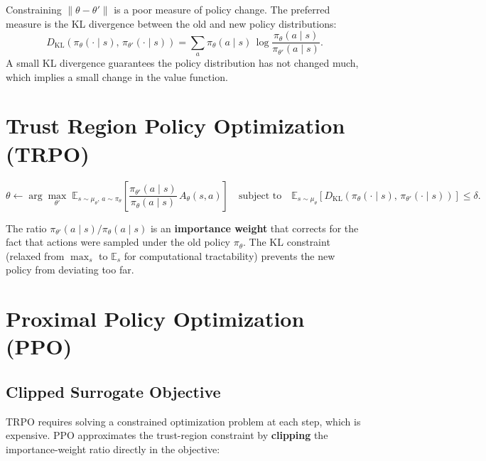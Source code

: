 \documentclass[11pt,a4paper]{article}
\theoremstyle{definition}
\theoremstyle{plain}
\theoremstyle{remark}
\begin{document}
Constraining $\|\theta - \theta'\|$ is a poor measure of policy change. The preferred measure is the KL divergence between the old and new policy distributions:
\[
    D_{\mathrm{KL}}\!\left(\pi_\theta(\cdot \mid s),\, \pi_{\theta'}(\cdot \mid s)\right)
    = \sum_a \pi_\theta(a \mid s)\, \log\frac{\pi_\theta(a \mid s)}{\pi_{\theta'}(a \mid s)}.
\]
A small KL divergence guarantees the policy distribution has not changed much, which implies a small change in the value function.

\section{Trust Region Policy Optimization (TRPO)}

\begin{tcolorbox}[colback=blue!5!white,colframe=blue!75!black,title=\textbf{TRPO Objective (Schulman et al., ICML 2015)}]
\[
    \theta \leftarrow \arg\max_{\theta'}\; \mathbb{E}_{s \sim \mu_\theta,\, a \sim \pi_\theta}\!\left[\frac{\pi_{\theta'}(a \mid s)}{\pi_\theta(a \mid s)}\, A_\theta(s, a)\right]
    \quad \text{subject to} \quad
    \mathbb{E}_{s \sim \mu_\theta}\!\left[D_{\mathrm{KL}}\!\left(\pi_\theta(\cdot \mid s),\, \pi_{\theta'}(\cdot \mid s)\right)\right] \le \delta.
\]
\end{tcolorbox}

The ratio $\pi_{\theta'}(a \mid s)/\pi_\theta(a \mid s)$ is an \textbf{importance weight} that corrects for the fact that actions were sampled under the old policy $\pi_\theta$. The KL constraint (relaxed from $\max_s$ to $\mathbb{E}_s$ for computational tractability) prevents the new policy from deviating too far.

\section{Proximal Policy Optimization (PPO)}

\subsection{Clipped Surrogate Objective}

TRPO requires solving a constrained optimization problem at each step, which is expensive. PPO approximates the trust-region constraint by \textbf{clipping} the importance-weight ratio directly in the objective:
\end{document}

